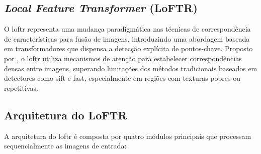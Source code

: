 \subsection{\textit{Local Feature Transformer} (LoFTR)}\label{subsec:loftr}

O \gls{loftr} representa uma mudança paradigmática nas técnicas de correspondência de características para fusão de imagens, introduzindo uma abordagem baseada em transformadores que dispensa a detecção explícita de pontos-chave. Proposto por , o \gls{loftr} utiliza mecanismos de atenção para estabelecer correspondências densas entre imagens, superando limitações dos métodos tradicionais baseados em detectores como \gls{sift} e \gls{fast}, especialmente em regiões com texturas pobres ou repetitivas.

\subsection*{Arquitetura do LoFTR}

A arquitetura do \gls{loftr} é composta por quatro módulos principais que processam sequencialmente as imagens de entrada:

